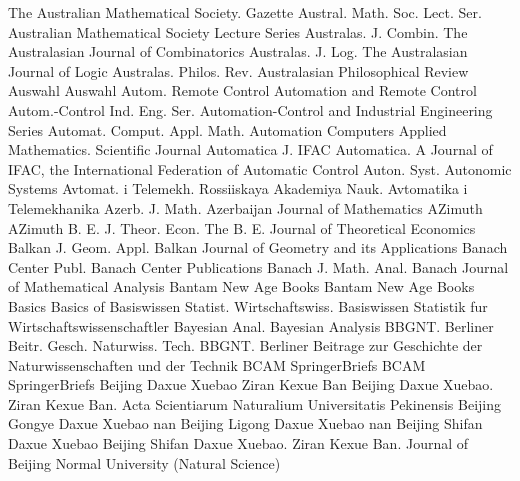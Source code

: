 {The Australian Mathematical Society. Gazette}
{Austral. Math. Soc. Lect. Ser.}
{Australian Mathematical Society Lecture Series}
{Australas. J. Combin.}
{The Australasian Journal of Combinatorics}
{Australas. J. Log.}
{The Australasian Journal of Logic}
{Australas. Philos. Rev.}
{Australasian Philosophical Review}
{Auswahl}
{Auswahl}
{Autom. Remote Control}
{Automation and Remote Control}
{Autom.-Control Ind. Eng. Ser.}
{Automation-Control and Industrial Engineering Series}
{Automat. Comput. Appl. Math.}
{Automation Computers Applied Mathematics. Scientific Journal}
{Automatica J. IFAC}
{Automatica. A Journal of IFAC, the International Federation of Automatic Control}
{Auton. Syst.}
{Autonomic Systems}
{Avtomat. i Telemekh.}
{Rossiiskaya Akademiya Nauk. Avtomatika i Telemekhanika}
{Azerb. J. Math.}
{Azerbaijan Journal of Mathematics}
{AZimuth}
{AZimuth}
{B. E. J. Theor. Econ.}
{The B. E. Journal of Theoretical Economics}
{Balkan J. Geom. Appl.}
{Balkan Journal of Geometry and its Applications}
{Banach Center Publ.}
{Banach Center Publications}
{Banach J. Math. Anal.}
{Banach Journal of Mathematical Analysis}
{Bantam New Age Books}
{Bantam New Age Books}
{Basics}
{Basics of}
{Basiswissen Statist. Wirtschaftswiss.}
{Basiswissen Statistik fur Wirtschaftswissenschaftler}
{Bayesian Anal.}
{Bayesian Analysis}
{BBGNT. Berliner Beitr. Gesch. Naturwiss. Tech.}
{BBGNT. Berliner Beitrage zur Geschichte der Naturwissenschaften und der Technik}
{BCAM SpringerBriefs}
{BCAM SpringerBriefs}
{Beijing Daxue Xuebao Ziran Kexue Ban}
{Beijing Daxue Xuebao. Ziran Kexue Ban. Acta Scientiarum Naturalium Universitatis Pekinensis}
{Beijing Gongye Daxue Xuebao}
{nan}
{Beijing Ligong Daxue Xuebao}
{nan}
{Beijing Shifan Daxue Xuebao}
{Beijing Shifan Daxue Xuebao. Ziran Kexue Ban. Journal of Beijing Normal University (Natural Science)}
